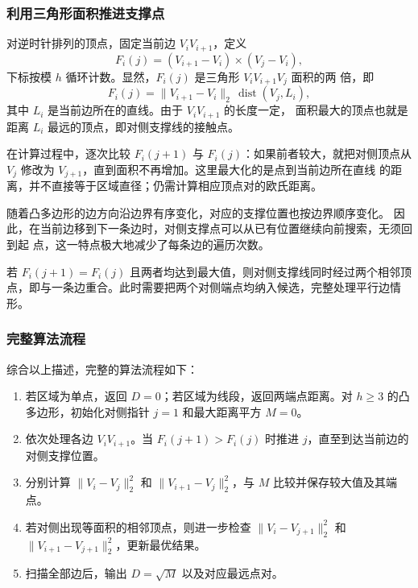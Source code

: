 \documentclass[withoutpreface,bwprint]{cumcmthesis} %
\begin{document}
\subsubsection{利用三角形面积推进支撑点}

对逆时针排列的顶点，固定当前边 $V_iV_{i+1}$，定义
\begin{equation}\label{eq:p1-area}
    F_i(j)=(V_{i+1}-V_i)\times(V_j-V_i),
\end{equation}
下标按模 $h$ 循环计数。显然，$F_i(j)$ 是三角形 $V_iV_{i+1}V_j$ 面积的两
倍，即
\begin{equation}
    F_i(j)=\|V_{i+1}-V_i\|_2\,\operatorname{dist}(V_j,L_i),
\end{equation}
其中 $L_i$ 是当前边所在的直线。由于 $V_iV_{i+1}$ 的长度一定，
面积最大的顶点也就是距离 $L_i$ 最远的顶点，即对侧支撑线的接触点。

在计算过程中，逐次比较 $F_i(j+1)$ 与 $F_i(j)$：如果前者较大，就把对侧顶点从
 $V_j$ 修改为 $V_{j+1}$，直到面积不再增加。这里最大化的是点到当前边所在直线
的距离，并不直接等于区域直径；仍需计算相应顶点对的欧氏距离。

随着凸多边形的边方向沿边界有序变化，对应的支撑位置也按边界顺序变化。
因此，在当前边移到下一条边时，对侧支撑点可以从已有位置继续向前搜索，无须回到起
点，这一特点极大地减少了每条边的遍历次数。

若 $F_i(j+1)=F_i(j)$ 且两者均达到最大值，则对侧支撑线同时经过两个相邻顶点，即与一条边重合。此时需要把两个对侧端点均纳入候选，完整处理平行边情形。

\subsubsection{完整算法流程}

综合以上描述，完整的算法流程如下：
\begin{enumerate}[label=\arabic*)]
    \item 若区域为单点，返回 $D=0$；若区域为线段，返回两端点距离。对 $h\ge3$ 的凸多边形，初始化对侧指针 $j=1$ 和最大距离平方 $M=0$。
    \item 依次处理各边 $V_iV_{i+1}$。当 $F_i(j+1)>F_i(j)$ 时推进 $j$，直至到达当前边的对侧支撑位置。
    \item 分别计算 $\|V_i-V_j\|_2^2$ 和 $\|V_{i+1}-V_j\|_2^2$，与 $M$ 比较并保存较大值及其端点。
    \item 若对侧出现等面积的相邻顶点，则进一步检查 $\|V_i-V_{j+1}\|_2^2$ 和 $\|V_{i+1}-V_{j+1}\|_2^2$，更新最优结果。
    \item 扫描全部边后，输出 $D=\sqrt M$ 以及对应最远点对。
\end{enumerate}
\end{document}
